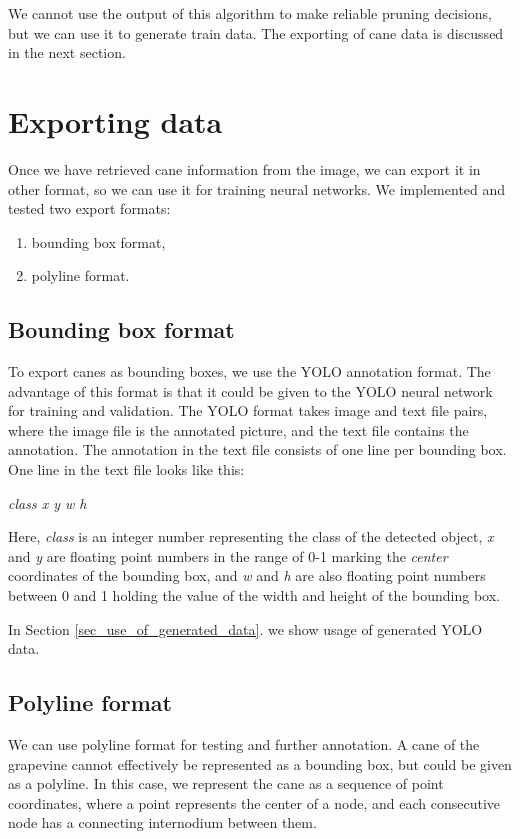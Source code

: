 \documentclass{PSAIE}%
\begin{document}
We cannot use the output of this algorithm to make reliable pruning decisions, but we can use it to generate
train data. The exporting of cane data is discussed in the next section.

\section{Exporting data} \label{sec_exporting_data}
Once we have retrieved cane information from the image, we can export it in other format, so we can use it for
training neural networks. We implemented and tested two export formats:

\begin{enumerate}
      \item bounding box format,
      \item polyline format.
\end{enumerate}

\subsection{Bounding box format} \label{sec_export_bounding_box_format}
To export canes as bounding boxes, we use the YOLO annotation format. The advantage of this format is that
it could be given to the YOLO neural network for training and validation. The YOLO format takes image and
text file pairs, where the image file is the annotated picture, and the text file contains the annotation.
The annotation in the text file consists of one line per bounding box. One line in the text file looks like
this:

\textit{class x y w h}

Here, \textit{class} is an integer number representing the class of the detected object, \textit{x} and
\textit{y} are floating point numbers in the range of 0-1 marking the \textit{center} coordinates of the
bounding box, and \textit{w} and \textit{h} are also floating point numbers between 0 and 1 holding the
value of the width and height of the bounding box.

In Section \ref{sec_use_of_generated_data}. we show usage of generated YOLO data.

\subsection{Polyline format} \label{sec_export_polyline_format}
We can use polyline format for testing and further annotation. A cane of the grapevine cannot effectively
be represented as a bounding box, but could be given as a polyline. In this case, we represent the cane
as a sequence of point coordinates, where a point represents the center of a node, and each consecutive
node has a connecting internodium between them.
\end{document}

